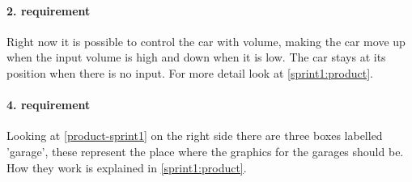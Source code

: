 \paragraph{2. requirement}\label{sprint1:req2}
Right now it is possible to control the car with volume, making the car move up when the input volume is high and down when it is low.
The car stays at its position when there is no input.
For more detail look at \cref{sprint1:product}.
\paragraph{4. requirement}\label{sprint1:req4}
Looking at \cref{product-sprint1} on the right side there are three boxes labelled 'garage', these represent the place where the graphics for the garages should be.
How they work is explained in \cref{sprint1:product}.